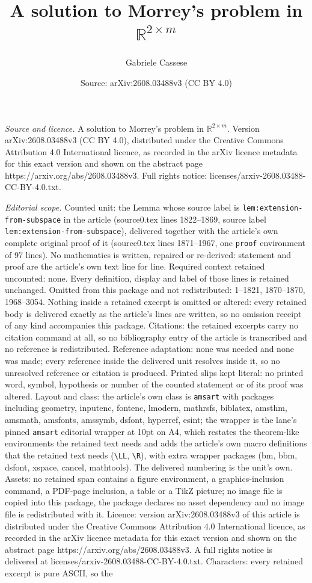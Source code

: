 \documentclass[10pt,a4paper]{amsart}
\title[A solution to Morrey's problem in $\mathbb{R}^{2\times m}$]{A solution to Morrey's problem in $\mathbb{R}^{2\times m}$}
\author{Gabriele Cassese}
\date{Source: arXiv:2608.03488v3 (CC BY 4.0)}
\begin{document}
\maketitle

\noindent\emph{Source and licence.} A solution to Morrey's problem in $\mathbb{R}^{2\times m}$. Version arXiv:2608.03488v3 (CC BY 4.0), distributed under the Creative Commons Attribution 4.0 International licence, as recorded in the arXiv licence metadata for this exact version and shown on the abstract page https://arxiv.org/abs/2608.03488v3. Full rights notice: licenses/arxiv-2608.03488-CC-BY-4.0.txt.\par\smallskip

\noindent\textit{Editorial scope.} Counted unit: the Lemma whose source label is \texttt{lem:extension-from-subspace} in the article (source0.tex lines 1822--1869, source label \texttt{lem:extension-from-subspace}), delivered together with the article's own complete original proof of it (source0.tex lines 1871--1967, one \texttt{proof} environment of 97 lines). No mathematics is written, repaired or re-derived: statement and proof are the article's own text line for line. Required context retained uncounted: none. Every definition, display and label of those lines is retained unchanged. Omitted from this package and not redistributed: 1--1821, 1870--1870, 1968--3054. Nothing inside a retained excerpt is omitted or altered: every retained body is delivered exactly as the article's lines are written, so no omission receipt of any kind accompanies this package. Citations: the retained excerpts carry no citation command at all, so no bibliography entry of the article is transcribed and no reference is redistributed. Reference adaptation: none was needed and none was made; every reference inside the delivered unit resolves inside it, so no unresolved reference or citation is produced. Printed slips kept literal: no printed word, symbol, hypothesis or number of the counted statement or of its proof was altered. Layout and class: the article's own class is \texttt{amsart} with packages including geometry, inputenc, fontenc, lmodern, mathrsfs, biblatex, amsthm, amsmath, amsfonts, amssymb, dsfont, hyperref, esint; the wrapper is the lane's pinned \texttt{amsart} editorial wrapper at 10pt on A4, which restates the theorem-like environments the retained text needs and adds the article's own macro definitions that the retained text needs (\texttt{\textbackslash LL}, \texttt{\textbackslash R}), with extra wrapper packages (bm, bbm, dsfont, xspace, cancel, mathtools). The delivered numbering is the unit's own. Assets: no retained span contains a figure environment, a graphics-inclusion command, a PDF-page inclusion, a table or a TikZ picture; no image file is copied into this package, the package declares no asset dependency and no image file is redistributed with it. Licence: version arXiv:2608.03488v3 of this article is distributed under the Creative Commons Attribution 4.0 International licence, as recorded in the arXiv licence metadata for this exact version and shown on the abstract page https://arxiv.org/abs/2608.03488v3. A full rights notice is delivered at licenses/arxiv-2608.03488-CC-BY-4.0.txt. Characters: every retained excerpt is pure ASCII, so the 
\end{document}

